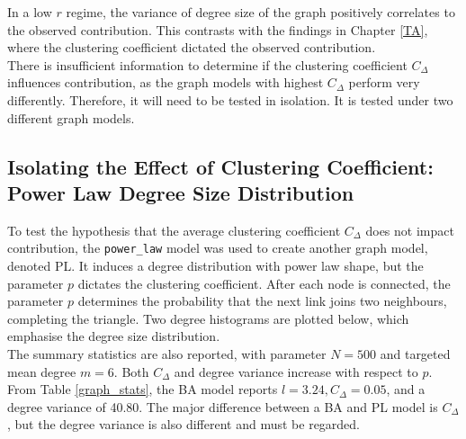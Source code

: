 In a low $r$ regime, the variance of degree size of the graph positively correlates to the observed contribution. This contrasts with the findings in Chapter \ref{TA}, where the clustering coefficient dictated the observed contribution. \\

There is insufficient information to determine if the clustering coefficient $C_\Delta$ influences contribution, as the graph models with highest $C_\Delta$ perform very differently. Therefore, it will need to be tested in isolation. It is tested under two different graph models. 

\subsection{Isolating the Effect of Clustering Coefficient: Power Law Degree Size Distribution}
To test the hypothesis that the average clustering coefficient $C_\Delta$ does not impact contribution, the \verb+power_law+ model was used to create another graph model, denoted PL. It induces a degree distribution with power law shape, but the parameter $p$ dictates the clustering coefficient. After each node is connected, the parameter $p$ determines the probability that the next link joins two neighbours, completing the triangle. Two degree histograms are plotted below, which emphasise the degree size distribution. \\
\FloatBarrier
{}
\FloatBarrier
{}
\FloatBarrier
The summary statistics are also reported, with parameter $N = 500$ and targeted mean degree $m=6$. Both $C_\Delta$ and degree variance increase with respect to $p$. From Table \ref{graph_stats}, the BA model reports $l=3.24, C_\Delta = 0.05$, and a degree variance of 40.80. The major difference between a BA and PL model is $C_\Delta$, but the degree variance is also different and must be regarded.   \\
\FloatBarrier
